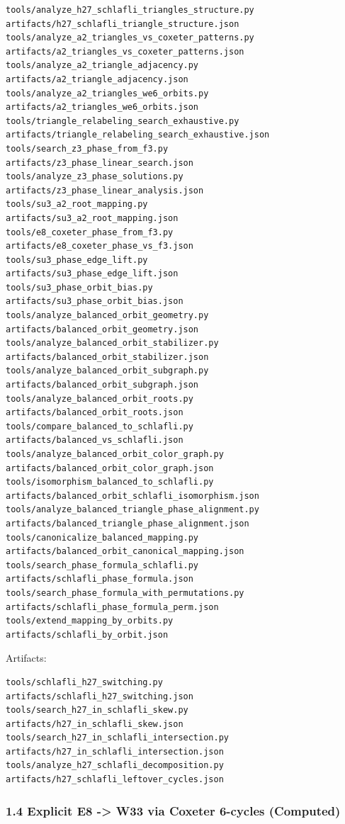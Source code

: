 \documentclass[11pt]{article}
\begin{document}
\begin{verbatim}
tools/analyze_h27_schlafli_triangles_structure.py
artifacts/h27_schlafli_triangle_structure.json
tools/analyze_a2_triangles_vs_coxeter_patterns.py
artifacts/a2_triangles_vs_coxeter_patterns.json
tools/analyze_a2_triangle_adjacency.py
artifacts/a2_triangle_adjacency.json
tools/analyze_a2_triangles_we6_orbits.py
artifacts/a2_triangles_we6_orbits.json
tools/triangle_relabeling_search_exhaustive.py
artifacts/triangle_relabeling_search_exhaustive.json
tools/search_z3_phase_from_f3.py
artifacts/z3_phase_linear_search.json
tools/analyze_z3_phase_solutions.py
artifacts/z3_phase_linear_analysis.json
tools/su3_a2_root_mapping.py
artifacts/su3_a2_root_mapping.json
tools/e8_coxeter_phase_from_f3.py
artifacts/e8_coxeter_phase_vs_f3.json
tools/su3_phase_edge_lift.py
artifacts/su3_phase_edge_lift.json
tools/su3_phase_orbit_bias.py
artifacts/su3_phase_orbit_bias.json
tools/analyze_balanced_orbit_geometry.py
artifacts/balanced_orbit_geometry.json
tools/analyze_balanced_orbit_stabilizer.py
artifacts/balanced_orbit_stabilizer.json
tools/analyze_balanced_orbit_subgraph.py
artifacts/balanced_orbit_subgraph.json
tools/analyze_balanced_orbit_roots.py
artifacts/balanced_orbit_roots.json
tools/compare_balanced_to_schlafli.py
artifacts/balanced_vs_schlafli.json
tools/analyze_balanced_orbit_color_graph.py
artifacts/balanced_orbit_color_graph.json
tools/isomorphism_balanced_to_schlafli.py
artifacts/balanced_orbit_schlafli_isomorphism.json
tools/analyze_balanced_triangle_phase_alignment.py
artifacts/balanced_triangle_phase_alignment.json
tools/canonicalize_balanced_mapping.py
artifacts/balanced_orbit_canonical_mapping.json
tools/search_phase_formula_schlafli.py
artifacts/schlafli_phase_formula.json
tools/search_phase_formula_with_permutations.py
artifacts/schlafli_phase_formula_perm.json
tools/extend_mapping_by_orbits.py
artifacts/schlafli_by_orbit.json
\end{verbatim}

Artifacts:

\begin{verbatim}
tools/schlafli_h27_switching.py
artifacts/schlafli_h27_switching.json
tools/search_h27_in_schlafli_skew.py
artifacts/h27_in_schlafli_skew.json
tools/search_h27_in_schlafli_intersection.py
artifacts/h27_in_schlafli_intersection.json
tools/analyze_h27_schlafli_decomposition.py
artifacts/h27_schlafli_leftover_cycles.json
\end{verbatim}

\subsubsection{1.4 Explicit E8 -\textgreater{} W33 via Coxeter 6-cycles
(Computed)}\label{explicit-e8---w33-via-coxeter-6-cycles-computed}
\end{document}

